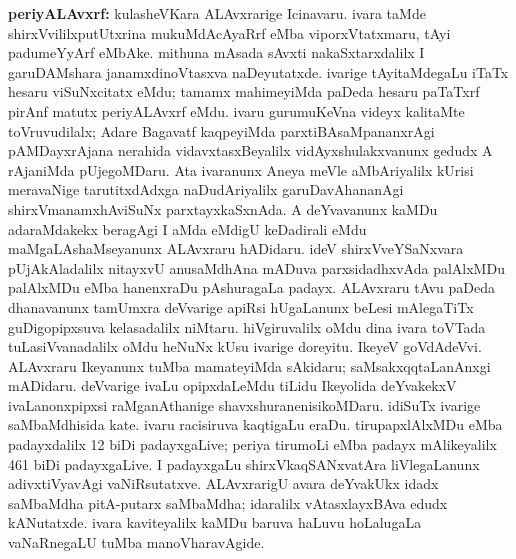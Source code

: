 {\large\textbf{periyALAvxrf:}} kulasheVKara ALAvxrarige Icinavaru. ivara taMde shirxVvililxputUtxrina mukuMdAcAyaRrf eMba viporxVtatxmaru, tAyi padumeYyArf eMbAke. mithuna mAsada sAvxti nakaSxtarxdalilx I garuDAMshara janamxdinoVtasxva naDeyutatxde. ivarige tAyitaMdegaLu iTaTx hesaru viSuNxcitatx eMdu; tamamx mahimeyiMda paDeda hesaru paTaTxrf pirAnf matutx periyALAvxrf eMdu. ivaru gurumuKeVna videyx kalitaMte toVruvudilalx; Adare Bagavatf kaqpeyiMda parxtiBAsaMpananxrAgi pAMDayxrAjana nerahida vidavxtasxBeyalilx vidAyxshulakxvanunx gedudx A rAjaniMda pUjegoMDaru. Ata ivaranunx Aneya meVle aMbAriyalilx kUrisi meravaNige tarutitxdAdxga naDudAriyalilx garuDavAhananAgi shirxVmanamxhAviSuNx parxtayxkaSxnAda. A deYvavanunx kaMDu adaraMdakekx beragAgi I aMda eMdigU keDadirali eMdu maMgaLAshaMseyanunx ALAvxraru hADidaru. ideV shirxVveYSaNxvara pUjAkAladalilx nitayxvU anusaMdhAna mADuva parxsidadhxvAda palAlxMDu palAlxMDu eMba hanenxraDu pAshuragaLa padayx. ALAvxraru tAvu paDeda dhanavanunx tamUmxra deVvarige apiRsi hUgaLanunx beLesi mAlegaTiTx guDigopipxsuva kelasadalilx niMtaru. hiVgiruvalilx oMdu dina ivara toVTada tuLasiVvanadalilx oMdu heNuNx kUsu ivarige doreyitu. IkeyeV goVdAdeVvi. ALAvxraru Ikeyanunx tuMba mamateyiMda sAkidaru; saMsakxqqtaLanAnxgi mADidaru. deVvarige ivaLu opipxdaLeMdu tiLidu Ikeyolida deYvakekxV ivaLanonxpipxsi raMganAthanige shavxshuranenisikoMDaru. idiSuTx ivarige saMbaMdhisida kate. ivaru racisiruva kaqtigaLu eraDu. tirupapxlAlxMDu eMba padayxdalilx {\rm 12} biDi padayxgaLive; periya tirumoLi eMba padayx mAlikeyalilx {\rm 461} biDi padayxgaLive. I padayxgaLu shirxVkaqSANxvatAra liVlegaLanunx adivxtiVyavAgi vaNiRsutatxve. ALAvxrarigU avara deYvakUkx idadx saMbaMdha pitA-putarx saMbaMdha; idaralilx vAtasxlayxBAva edudx kANutatxde. ivara kaviteyalilx kaMDu baruva haLuvu hoLalugaLa vaNaRnegaLU tuMba manoVharavAgide.

